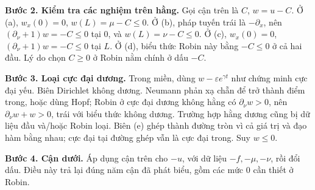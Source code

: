 \documentclass[10pt,a4paper]{article}
\begin{document}
\textbf{Bước 2. Kiểm tra các nghiệm trên hằng.} Gọi cận trên là $C$, $w=u-C$. Ở (a), $w_x(0)=0$, $w(L)=\mu-C\le0$. Ở (b), pháp tuyến trái là $-\partial_x$, nên $(\partial_\nu+1)w=-C\le0$ tại $0$, và $w(L)=\nu-C\le0$. Ở (c), $w_x(0)=0$, $(\partial_\nu+1)w=-C\le0$ tại $L$. Ở (d), biểu thức Robin này bằng $-C\le0$ ở cả hai đầu. Lý do chọn $C\ge0$ ở Robin nằm chính ở dấu $-C$.

\textbf{Bước 3. Loại cực đại dương.} Trong miền, dùng $w-\varepsilon e^{\gamma t}$ như chứng minh cực đại yếu. Biên Dirichlet không dương. Neumann phản xạ chẵn để trở thành điểm trong, hoặc dùng Hopf; Robin ở cực đại dương không hằng có $\partial_\nu w>0$, nên $\partial_\nu w+w>0$, trái với biểu thức không dương. Trường hợp hằng dương cũng bị dữ liệu đầu và/hoặc Robin loại. Biên (e) ghép thành đường tròn vì cả giá trị và đạo hàm bằng nhau; cực đại tại đường ghép vẫn là cực đại trong. Suy $w\le0$.

\textbf{Bước 4. Cận dưới.} Áp dụng cận trên cho $-u$, với dữ liệu $-f,-\mu,-\nu$, rồi đổi dấu. Điều này trả lại đúng năm cận đã phát biểu, gồm các mức $0$ cần thiết ở Robin.
\end{document}
